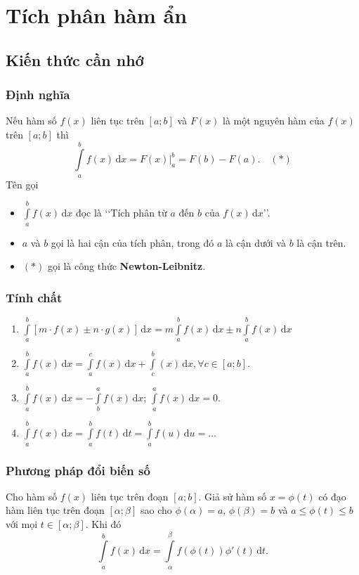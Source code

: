 \setcounter{section}{39}
\setcounter{ex}{0}
\section{Tích phân hàm ẩn}
\subsection{Kiến thức cần nhớ}
\begin{khung}
    \subsubsection{Định nghĩa}
    Nếu hàm số $f(x)$ liên tục trên $[a;b]$ và $F(x)$ là một nguyên hàm của $f(x)$ trên $[a;b]$ thì
    \[\displaystyle\int\limits_{a}^{b} f(x) \mathrm{\,d}x=F(x)\bigg|_a^b=F(b)-F(a).\quad(*) \]
Tên gọi
\begin{itemize}
    \item $\displaystyle\int\limits_{a}^{b} f(x) \mathrm{\,d}x$ đọc là \lq\lq Tích phân từ $a$ đến $b$ của $f(x)\mathrm{\,d}x$\rq\rq.
    \item $a$ và $b$ gọi là hai cận của tích phân, trong đó $a$ là cận dưới và $b$ là cận trên.
    \item $(*)$ gọi là công thức \textbf{Newton-Leibnitz}.
\end{itemize}
\subsubsection{Tính chất}
\begin{enumerate}
    \item $\displaystyle\int\limits_a^b[m\cdot f(x)\pm n\cdot g(x)]\mathrm{\,d}x=m\displaystyle\int\limits_a^bf(x)\mathrm{\,d}x\pm n\displaystyle\int\limits_a^bf(x)\mathrm{\,d}x$
    \item $\displaystyle\int\limits_a^bf(x)\mathrm{\,d}x=\displaystyle\int\limits_a^cf(x)\mathrm{\,d}x+\displaystyle\int\limits_c^b(x)\mathrm{\,d}x,\forall c\in[a ; b]$.
    \item $\displaystyle\int\limits_{a}^bf(x)\mathrm{\,d}x=-\displaystyle\int\limits_b^af(x)\mathrm{\,d}x$; $\displaystyle\int\limits_a^af(x)\mathrm{\,d}x=0$. 
    \item $\displaystyle\int\limits_{a}^bf(x)\mathrm{\,d}x=\displaystyle\int\limits_a^b f(t)\mathrm{\,d}t=\displaystyle\int\limits_a^b f(u)\mathrm{\,d}u= \ldots$
\end{enumerate}
\subsubsection{Phương pháp đổi biến số}
Cho hàm số $f(x)$ liên tục trên đoạn $[a;b]$. Giả sử hàm số $x= \phi (t)$ có đạo hàm liên tục trên đoạn $[\alpha; \beta]$ sao cho $\phi (\alpha)=a$, $\phi (\beta)=b$ và $a \le \phi (t) \le b$ với mọi $t \in [\alpha; \beta]$. Khi đó
$$\displaystyle\int\limits_a^b f(x)\mathrm{\,d}x= \displaystyle\int\limits_{\alpha}^{\beta} f\left(\phi (t)\right) \phi'(t)\mathrm{\,d}t.$$

\end{khung}
